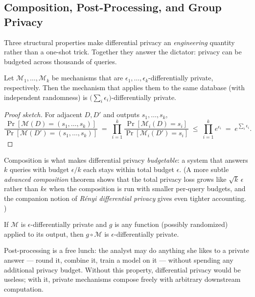 \subsection{Composition, Post-Processing, and Group Privacy}
\label{sec:dp:composition}

Three structural properties make differential privacy an \emph{engineering} quantity rather than a one-shot trick. Together they answer the dictator: privacy can be budgeted across thousands of queries. 

\begin{theorem}
\label{thm:dp:composition}
Let $\mathcal{M}_1, \ldots, \mathcal{M}_k$ be mechanisms that are $\epsilon_1, \ldots, \epsilon_k$-differentially private, respectively. Then the mechanism that applies them to the same database (with independent randomness) is $\bigl(\sum_i \epsilon_i\bigr)$-differentially private.
\end{theorem}

\begin{proof}[Proof sketch]
For adjacent $D, D'$ and outputs $s_1, \ldots, s_k$,
\[
\frac{\Pr[\mathcal{M}(D) = (s_1,\ldots,s_k)]}{\Pr[\mathcal{M}(D') = (s_1,\ldots,s_k)]}
\;=\; \prod_{i=1}^{k} \frac{\Pr[\mathcal{M}_i(D) = s_i]}{\Pr[\mathcal{M}_i(D') = s_i]}
\;\le\; \prod_{i=1}^{k} e^{\epsilon_i}
\;=\; e^{\sum_i \epsilon_i}.
\]
\end{proof}

Composition is what makes differential privacy \emph{budgetable}: a system that answers $k$ queries with budget $\epsilon/k$ each stays within total budget $\epsilon$. (A more subtle \emph{advanced composition} theorem shows that the total privacy loss grows like $\sqrt{k}\,\epsilon$ rather than $k \epsilon$ when the composition is run with smaller per-query budgets, and the companion notion of \emph{R\'enyi differential privacy} gives even tighter accounting. \cite{mironov2017}) 

\begin{theorem}
\label{thm:dp:post}
If $\mathcal{M}$ is $\epsilon$-differentially private and $g$ is any function (possibly randomized) applied to its output, then $g \circ \mathcal{M}$ is $\epsilon$-differentially private.
\end{theorem}

Post-processing is a free lunch: the analyst may do anything she likes to a private answer --- round it, combine it, train a model on it --- without spending any additional privacy budget. Without this property, differential privacy would be useless; with it, private mechanisms compose freely with arbitrary downstream computation.

